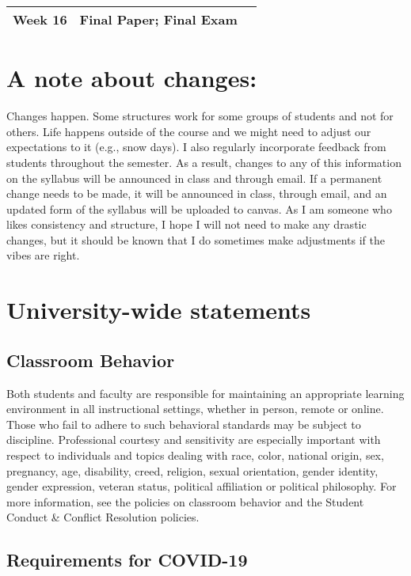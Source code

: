 \documentclass[11pt, a4paper]{article}
\begin{document}
\begin{longtable}[hbt!]{p{}p{}p{}}
        \hline
        Week 16 & Final Paper; Final Exam \\
        \hline

\end{longtable}

\section*{A note about changes:}

Changes happen. Some structures work for some groups of students and not for others. Life happens outside of the course and we might need to adjust our expectations to it (e.g., snow days). I also regularly incorporate feedback from students throughout the semester. As a result, changes to any of this information on the syllabus will be announced in class and through email. If a permanent change needs to be made, it will be announced in class, through email, and an updated form of the syllabus will be uploaded to canvas. As I am someone who likes consistency and structure, I hope I will not need to make any drastic changes, but it should be known that I do sometimes make adjustments if the vibes are right.

\newpage
\section*{University-wide statements}

\subsection*{Classroom Behavior}

Both students and faculty are responsible for maintaining an appropriate learning environment in all instructional settings, whether in person, remote or online. Those who fail to adhere to such behavioral standards may be subject to discipline. Professional courtesy and sensitivity are especially important with respect to individuals and topics dealing with race, color, national origin, sex, pregnancy, age, disability, creed, religion, sexual orientation, gender identity, gender expression, veteran status, political affiliation or political philosophy.  For more information, see the policies on classroom behavior and the Student Conduct \& Conflict Resolution policies.

\subsection*{Requirements for COVID-19}
\end{document}
